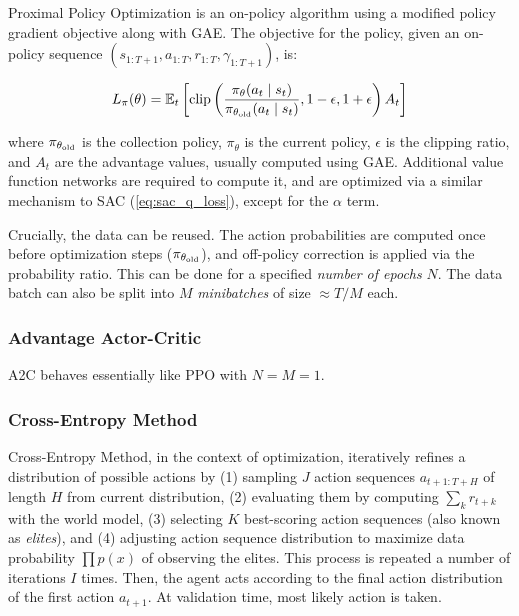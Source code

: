 \documentclass[en]{pracamgr}
\DeclareMathOperator*{\clip}{clip}
\begin{document}
\begin{sloppypar}
  Proximal Policy Optimization is an on-policy algorithm using a modified policy gradient objective along with GAE. The objective for the policy, given an on-policy sequence $(s_{1:T+1}, a_{1:T}, r_{1:T}, \gamma_{1:T+1})$, is:
\end{sloppypar}

\begin{align*}
  L_\pi(\theta) = \mathbb{E}_t \left[\clip\left(\frac{\pi_\theta(a_t \mid s_t)}{\pi_{\theta_{\rm old}}(a_t \mid s_t)}, 1-\epsilon, 1+\epsilon\right) A_t \right]
\end{align*}

where $\pi_{\theta_{\rm old}}$ is the collection policy, $\pi_\theta$ is the current policy, $\epsilon$ is the clipping ratio, and $A_t$ are the advantage values, usually computed using GAE. Additional value function networks are required to compute it, and are optimized via a similar mechanism to SAC (\autoref{eq:sac_q_loss}), except for the $\alpha$ term.

Crucially, the data can be reused. The action probabilities are computed once before optimization steps ($\pi_{\theta_{\rm old}}$), and off-policy correction is applied via the probability ratio. This can be done for a specified \emph{number of epochs} $N$. The data batch can also be split into $M$ \emph{minibatches} of size $\approx T/M$ each.

\subsubsection{Advantage Actor-Critic}

A2C behaves essentially like PPO with $N = M = 1$.

\subsubsection{Cross-Entropy Method}

Cross-Entropy Method, in the context of optimization, iteratively refines a distribution of possible actions by (1) sampling $J$ action sequences $a_{t+1:T+H}$ of length $H$ from current distribution, (2) evaluating them by computing $\sum_k r_{t+k}$ with the world model, (3) selecting $K$ best-scoring action sequences (also known as \emph{elites}), and (4) adjusting action sequence distribution to  maximize data probability $\prod p(x)$ of observing the elites. This process is repeated a number of iterations $I$ times. Then, the agent acts according to the final action distribution of the first action $a_{t+1}$. At validation time, most likely action is taken.
\end{document}
